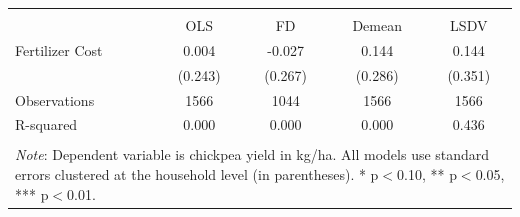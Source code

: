 \begin{tabular}{l*{4}{c}} 
\\[-1.8ex]\hline \hline \\[-1.8ex] 
& \multicolumn{1}{c}{OLS} & 
\multicolumn{1}{c}{FD} & 
\multicolumn{1}{c}{Demean} & 
\multicolumn{1}{c}{LSDV} \\ \midrule
\midrule
Fertilizer Cost     &       0.004         &      -0.027         &       0.144         &       0.144         \\
                    &     (0.243)         &     (0.267)         &     (0.286)         &     (0.351)         \\
\midrule
Observations        &        1566         &        1044         &        1566         &        1566         \\
R-squared           &       0.000         &       0.000         &       0.000         &       0.436         \\
\hline \hline \\[-1.8ex] 
\multicolumn{5}{p{\linewidth}}{\small 
\noindent \textit{Note}: Dependent variable 
is chickpea yield in kg/ha. All models use 
standard errors clustered at the 
household level (in parentheses). 
* p$<$0.10, ** p$<$0.05, *** p$<$0.01.} 
\end{tabular}
